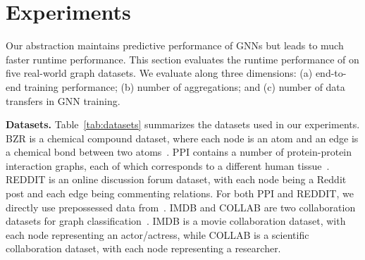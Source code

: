 \section{Experiments}
\label{sec:exp}
\begin{table}
\caption{Datasets used in the experiments.}
\label{tab:datasets}
\end{table}

Our \xg abstraction maintains predictive performance of GNNs but leads to much faster runtime performance. 
This section evaluates the runtime performance of \xgs on five real-world graph datasets.
We evaluate \xgs along three dimensions: (a) end-to-end training performance; (b) number of aggregations; and (c) number of data transfers in GNN training.


{\bf Datasets.} %
Table~\ref{tab:datasets} summarizes the datasets used in our experiments.
BZR is a chemical compound dataset, where each node is an atom and an edge is a chemical bond between two atoms~\cite{BZR}.
PPI contains a number of protein-protein interaction graphs, each of which corresponds to a different human tissue~\cite{PPI}.
REDDIT is an online discussion forum dataset, with each node being a Reddit post and each edge being commenting relations. For both PPI and REDDIT, we directly use prepossessed data from~\citet{GraphSAGE}.
IMDB and COLLAB are two collaboration datasets for graph classification~\cite{COLLAB}.
IMDB is a movie collaboration dataset, with each node representing an actor/actress, while COLLAB is a scientific collaboration dataset, with each node representing a researcher.

